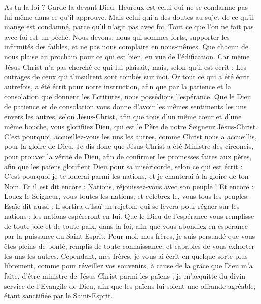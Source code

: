 \begin{multicols}{2}
As-tu la foi ? Garde-la devant Dieu. Heureux est celui qui ne se condamne pas lui-même dans ce qu'il approuve.
Mais celui qui a des doutes au sujet de ce qu’il mange est condamné, parce qu’il n’agit pas avec foi. Tout ce que l’on ne fait pas avec foi est un péché.
\VerseOne{}Nous devons, nous qui sommes forts, supporter les infirmités des faibles, et ne pas nous complaire en nous-mêmes.
Que chacun de nous plaise au prochain pour ce qui est bien, en vue de l’édification.
Car même Jésus-Christ n'a pas cherché ce qui lui plaisait, mais, selon qu’il est écrit : Les outrages de ceux qui t’insultent sont tombés sur moi.
Or tout ce qui a été écrit autrefois, a été écrit pour notre instruction, afin que par la patience et la consolation que donnent les Ecritures, nous possédions l’espérance.
Que le Dieu de patience et de consolation vous donne d’avoir les mêmes sentiments les uns envers les autres, selon Jésus-Christ,
afin que tous d'un même cœur et d'une même bouche, vous glorifiiez Dieu, qui est le Père de notre Seigneur Jésus-Christ.
C'est pourquoi, accueillez-vous les uns les autres, comme Christ nous a accueillis, pour la gloire de Dieu.
Je dis donc que Jésus-Christ a été Ministre des circoncis, pour prouver la vérité de Dieu, afin de confirmer les promesses faites aux pères,
afin que les païens glorifient Dieu pour sa miséricorde, selon ce qui est écrit : C’est pourquoi je te louerai parmi les nations, et je chanterai à la gloire de ton Nom. Et il est dit encore :
Nations, réjouissez-vous avec son peuple !
Et encore : Louez le Seigneur, vous toutes les nations, et célébrez-le, vous tous les peuples. Esaïe dit aussi :
Il sortira d’Isaï un rejeton, qui se lèvera pour régner sur les nations ; les nations espéreront en lui.
Que le Dieu de l’espérance vous remplisse de toute joie et de toute paix, dans la foi, afin que vous abondiez en espérance par la puissance du Saint-Esprit.
Pour moi, mes frères, je suis persuadé que vous êtes pleins de bonté, remplis de toute connaissance, et capables de vous exhorter les uns les autres.
Cependant, mes frères, je vous ai écrit en quelque sorte plus librement, comme pour réveiller vos souvenirs, à cause de la grâce que Dieu m’a faite,
d’être ministre de Jésus Christ parmi les païens ; je m’acquitte du divin service de l'Evangile de Dieu, afin que les païens lui soient une offrande agréable, étant sanctifiée par le Saint-Esprit.

\end{multicols}
